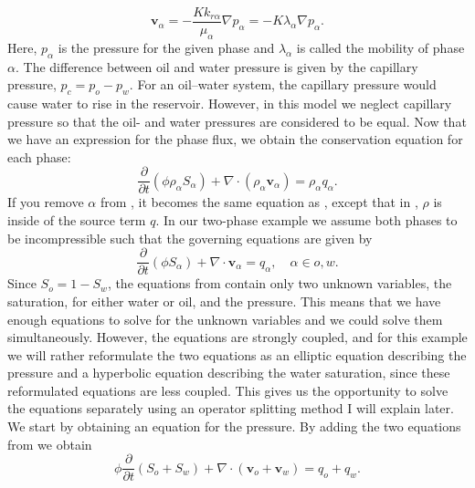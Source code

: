 \begin{equation*}
\textbf{v}_\alpha = - \frac{Kk_{r\alpha}}{\mu_\alpha}\nabla p_\alpha = -K\lambda_\alpha\nabla p_\alpha.
\end{equation*}
Here, $p_\alpha$ is the pressure for the given phase and $\lambda_\alpha$ is called the mobility of phase $\alpha$. The difference between oil and water pressure is given by the capillary pressure, $p_c = p_o - p_w$. For an oil--water system, the capillary pressure would cause water to rise in the reservoir. However, in this model we neglect capillary pressure so that the oil- and water pressures are considered to be equal. Now that we have an expression for the phase flux, we obtain the conservation equation for each phase:
\begin{equation}
    \frac{\partial}{\partial t}(\phi \rho_\alpha S_\alpha) + \nabla\cdot(\rho_\alpha\textbf{v}_\alpha) = \rho_\alpha q_\alpha.
    \label{eq:continuityEqMultiPhase}
\end{equation}
If you remove $\alpha$ from , it becomes the same equation as , except that in , $\rho$ is inside of the source term $q$. In our two-phase example we assume both phases to be incompressible such that the governing equations are given by
\begin{equation}
    \frac{\partial}{\partial t}(\phi S_\alpha) + \nabla\cdot\textbf{v}_\alpha =  q_\alpha, \hspace{1em} \alpha \in o, w.
    \label{eq:continuityEqsMultiPhaseIncomp}
\end{equation}
Since $S_o = 1 - S_w$, the equations from  contain only two unknown variables, the saturation, for either water or oil, and the pressure. This means that we have enough equations to solve for the unknown variables and we could solve them simultaneously. However, the equations are strongly coupled, and for this example we will rather reformulate the two equations as an elliptic equation describing the pressure and a hyperbolic equation describing the water saturation, since these reformulated equations are less coupled. This gives us the opportunity to solve the equations separately using an operator splitting method I will explain later. We start by obtaining an equation for the pressure. By adding the two equations from  we obtain
\begin{equation*}
    \phi \frac{\partial}{\partial t}(S_o + S_w) + \nabla\cdot(\textbf{v}_o + \textbf{v}_w) = q_o + q_w.
\end{equation*}
